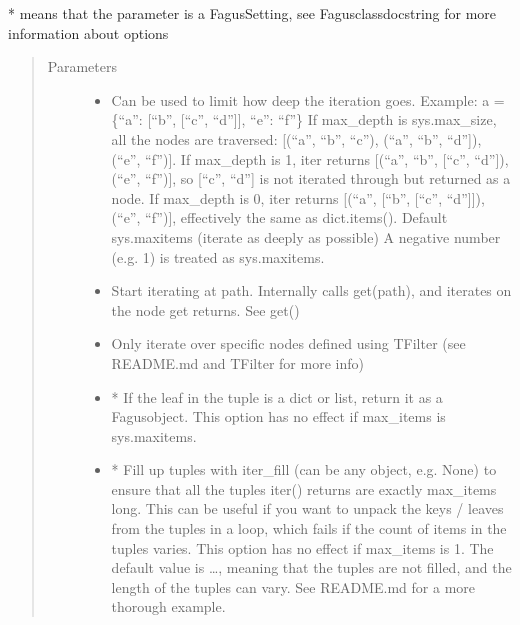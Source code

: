 \documentclass[a4paper,10pt,english]{sphinxmanual}
\begin{document}
\begin{fulllineitems}
\begin{fulllineitems}
\sphinxAtStartPar
* means that the parameter is a Fagus\sphinxhyphen{}Setting, see Fagus\sphinxhyphen{}class\sphinxhyphen{}docstring for more information about options
\begin{quote}\begin{description}
\item[{Parameters}] \leavevmode\begin{itemize}
\item {}
\sphinxAtStartPar
{} \textendash{} Can be used to limit how deep the iteration goes. Example: a = \{“a”: {[}“b”, {[}“c”, “d”{]}{]}, “e”: “f”\}
If max\_depth is sys.max\_size, all the nodes are traversed: {[}(“a”, “b”, “c”), (“a”, “b”, “d”{]}),
(“e”, “f”){]}. If max\_depth is 1, iter returns {[}(“a”, “b”, {[}“c”, “d”{]}), (“e”, “f”){]}, so {[}“c”, “d”{]} is not
iterated through but returned as a node. If max\_depth is 0, iter returns {[}(“a”, {[}“b”, {[}“c”, “d”{]}{]}),
(“e”, “f”){]}, effectively the same as dict.items(). Default sys.maxitems (iterate as deeply as possible)
A negative number (e.g. \sphinxhyphen{}1) is treated as sys.maxitems.

\item {}
\sphinxAtStartPar
{} \textendash{} Start iterating at path. Internally calls get(path), and iterates on the node get returns. See get()

\item {}
\sphinxAtStartPar
{} \textendash{} Only iterate over specific nodes defined using TFilter (see README.md and TFilter for more info)

\item {}
\sphinxAtStartPar
{} \textendash{} * If the leaf in the tuple is a dict or list, return it as a Fagus\sphinxhyphen{}object. This option has no
effect if max\_items is sys.maxitems.

\item {}
\sphinxAtStartPar
{} \textendash{} * Fill up tuples with iter\_fill (can be any object, e.g. None) to ensure that all the tuples
iter() returns are exactly max\_items long. This can be useful if you want to unpack the keys / leaves
from the tuples in a loop, which fails if the count of items in the tuples varies. This option has no
effect if max\_items is \sphinxhyphen{}1. The default value is …, meaning that the tuples are not filled, and the
length of the tuples can vary. See README.md for a more thorough example.


\end{itemize}
\end{description}
\end{quote}
\end{fulllineitems}
\end{fulllineitems}
\end{document}
